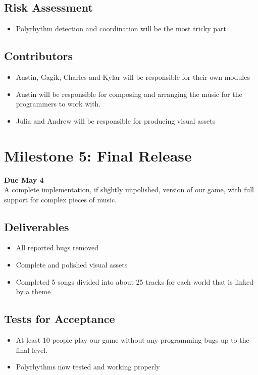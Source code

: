 \documentclass[]{article}
\begin{document}
\subsection*{Risk Assessment}
\begin{itemize}
\item Polyrhythm detection and coordination will be the most tricky part
\end{itemize}
\subsection*{Contributors}
\begin{itemize}
\item Austin, Gagik, Charles and Kylar will be responsible for their own modules
\item Austin will be responsible for composing and arranging the music 
  for the programmers to work with.
\item Julia and Andrew will be responsible for producing visual assets
\end{itemize}

\pagebreak
\section*{Milestone 5: Final Release}
\noindent\textbf{Due May 4}\\
A complete implementation, if slightly unpolished, version of our
game, with full support for complex pieces of music.
\subsection*{Deliverables}
\begin{itemize}
\item All reported bugs removed
\item Complete and polished visual assets
\item Completed 5 songs divided into about 25 tracks for each world that 
  is linked by a theme
\end{itemize}
\subsection*{Tests for Acceptance}
\begin{itemize}
\item At least 10 people play our game without any programming bugs 
  up to the final level.
\item Polyrhythms now tested and working properly
\end{itemize}
\end{document}
